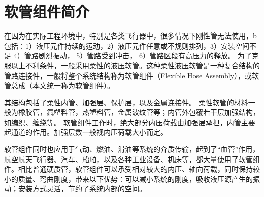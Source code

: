 \section{软管组件简介}

在因为在实际工程环境中，特别是各类飞行器中，很多情况下刚性管无法使用，b包括：1）液压元件持续的运动，2）液压元件任意或不规则排列，3）安装空间不足
4）管路剧烈振动，
5）管路受到冲击，
6）管路区段有高压力的释放。
为了克服以上不利条件，一般采用柔性的液压软管。这种柔性液压软管是一种复合结构的管路连接件，一般将整个系统结构称为软管组件（Flexible Hose Assembly），或软管总成（本文统一称为软管组件）。





其结构包括了柔性内管、加强层、保护层，以及金属连接件。
柔性软管的材料一般为橡胶管，氟塑料管，热塑料管，金属波纹管等；内管外包覆若干层加强结构，如编织、缠绕等。
软管组件工作时，绝大部分内压荷载由加强层承担，内管主要起通道的作用。加强层数一般视内压荷载大小而定。


\begin{figure}[!htbp]
	\centering
	\hspace{0.5cm}
	\label{fig:hose}
\end{figure}


软管组件同时也应用于气动、燃油、滑油等系统的介质传输，起到了“血管”作用，航空航天飞行器、汽车、船舶，以及各种工业设备、机床等，都大量使用了软管组件。相比普通硬质管，软管组件可以承受相对较大的内压、轴向荷载，同时保持较小的质量、弯曲刚度，带来以下优势：可以减小系统的刚度，吸收液压源产生的振动；安装方式灵活，节约了系统内部的空间。




